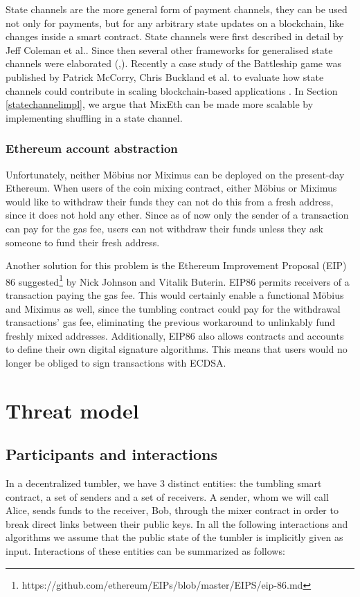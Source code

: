 \documentclass[conference, compsoc]{IEEEtran}
\theoremstyle{definition}
\begin{document}
State channels are the more general form of payment channels, they can be used not only for payments, but for any arbitrary state updates on a blockchain, like changes inside a smart contract. State channels were first described in detail by Jeff Coleman et al.\cite{coleman2018counterfactual}. Since then several other frameworks for generalised state channels were elaborated (\cite{dziembowski2017perun},\cite{mccorryyou}). Recently a case study of the Battleship game was published by Patrick McCorry, Chris Buckland et al. to evaluate how state channels could contribute in scaling blockchain-based applications \cite{mccorryyou}. In Section \ref{statechannelimpl}, we argue that MixEth can be made more scalable by implementing shuffling in a state channel. 

\subsubsection{Ethereum account abstraction}
Unfortunately, neither Möbius nor Miximus can be deployed on the present-day Ethereum. When users of the coin mixing contract, either Möbius or Miximus would like to withdraw their funds they can not do this from a fresh address, since it does not hold any ether. Since as of now only the sender of a transaction can pay for the gas fee, users can not withdraw their funds unless they ask someone to fund their fresh address.     

Another solution for this problem is the Ethereum Improvement Proposal (EIP) 86 suggested\footnote{https://github.com/ethereum/EIPs/blob/master/EIPS/eip-86.md} by Nick Johnson and Vitalik Buterin. EIP86 permits receivers of a transaction paying the gas fee. This would certainly enable a functional Möbius and Miximus as well, since the tumbling contract could pay for the withdrawal transactions' gas fee, eliminating the previous workaround to unlinkably fund freshly mixed addresses. Additionally, EIP86 also allows contracts and accounts to define their own digital signature algorithms. This means that users would no longer be obliged to sign transactions with ECDSA. 

\section{Threat model}
\subsection{Participants and interactions}
In a decentralized tumbler, we have $3$ distinct entities: the tumbling smart contract, a set of senders and a set of receivers. A sender, whom we will call Alice, sends funds to the receiver, Bob, through the mixer contract in order to break direct links between their public keys. In all the following interactions and algorithms we assume that the public state of the tumbler is implicitly given as input. Interactions of these entities can be summarized as follows: 
\end{document}
